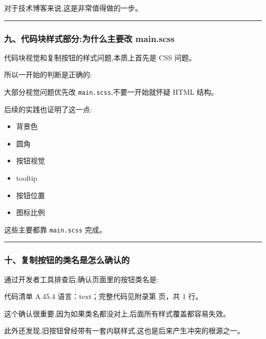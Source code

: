 \documentclass[lang=cn,scheme=chinese,color=blue,device=normal,toc=onecol,math=cm]{elegantbook}
\begin{document}
对于技术博客来说,这是非常值得做的一步。\par


\medskip\hrule\medskip


\subsubsection{九、代码块样式部分:为什么主要改 main.scss}


代码块视觉和复制按钮的样式问题,本质上首先是 CSS 问题。\par


所以一开始的判断是正确的:\par


\begin{quotebox}
大部分视觉问题优先改 \texttt{main.scss},不要一开始就怀疑 HTML 结构。\par
\end{quotebox}


后续的实践也证明了这一点:\par


\begin{itemize}
\item 背景色
\item 圆角
\item 按钮视觉
\item tooltip
\item 按钮位置
\item 图标比例
\end{itemize}


这些主要都靠 \texttt{main.scss} 完成。\par


\medskip\hrule\medskip


\subsubsection{十、复制按钮的类名是怎么确认的}


通过开发者工具排查后,确认页面里的按钮类名是:\par


\begin{codeindexbox}{代码清单 A.45.4}
语言：text；完整代码见附录第 \pageref{code:45:4} 页，共 1 行。
\end{codeindexbox}


这个确认很重要,因为如果类名都没对上,后面所有样式覆盖都容易失效。\par


此外还发现,旧按钮曾经带有一套内联样式,这也是后来产生冲突的根源之一。\par
\end{document}
